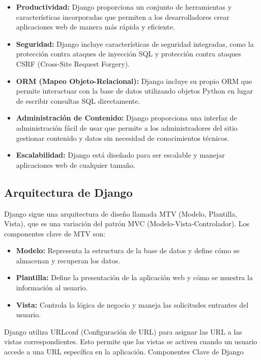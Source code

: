 \documentclass[
  a4paper,
  DIV=11,
  numbers=noendperiod,
  onepage,
  openany]{scrreprt}
\begin{document}
\begin{itemize}
\item
  \textbf{Productividad:} Django proporciona un conjunto de herramientas
  y características incorporadas que permiten a los desarrolladores
  crear aplicaciones web de manera más rápida y eficiente.
\item
  \textbf{Seguridad:} Django incluye características de seguridad
  integradas, como la protección contra ataques de inyección SQL y
  protección contra ataques CSRF (Cross-Site Request Forgery).
\item
  \textbf{ORM (Mapeo Objeto-Relacional):} Django incluye su propio ORM
  que permite interactuar con la base de datos utilizando objetos Python
  en lugar de escribir consultas SQL directamente.
\item
  \textbf{Administración de Contenido:} Django proporciona una interfaz
  de administración fácil de usar que permite a los administradores del
  sitio gestionar contenido y datos sin necesidad de conocimientos
  técnicos.
\item
  \textbf{Escalabilidad:} Django está diseñado para ser escalable y
  manejar aplicaciones web de cualquier tamaño.
\end{itemize}

\subsection{Arquitectura de Django}\label{arquitectura-de-django}

Django sigue una arquitectura de diseño llamada MTV (Modelo, Plantilla,
Vista), que es una variación del patrón MVC (Modelo-Vista-Controlador).
Los componentes clave de MTV son:

\begin{itemize}
\item
  \textbf{Modelo:} Representa la estructura de la base de datos y define
  cómo se almacenan y recuperan los datos.
\item
  \textbf{Plantilla:} Define la presentación de la aplicación web y cómo
  se muestra la información al usuario.
\item
  \textbf{Vista:} Controla la lógica de negocio y maneja las solicitudes
  entrantes del usuario.
\end{itemize}

Django utiliza URLconf (Configuración de URL) para asignar las URL a las
vistas correspondientes. Esto permite que las vistas se activen cuando
un usuario accede a una URL específica en la aplicación. Componentes
Clave de Django
\end{document}
